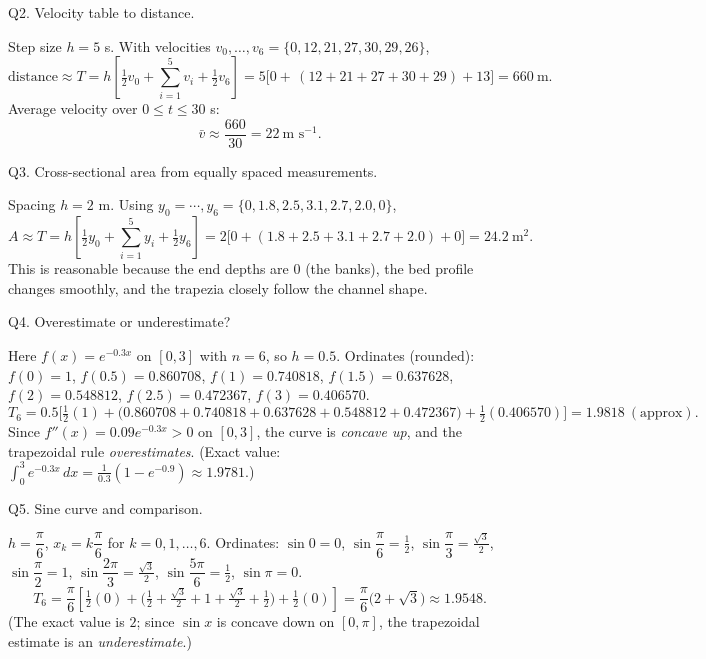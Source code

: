 \documentclass[11pt]{article}
\def\textbf#1{#1}%
\begin{document}
\begin{solution}
\textbf{Q2. Velocity table to distance.}

Step size \(h=5\) s.  With velocities \(v_0,\ldots,v_6=\{0,12,21,27,30,29,26\}\),
\[
\text{distance}\approx T
= h\!\left[\tfrac12 v_0+\sum_{i=1}^{5} v_i+\tfrac12 v_6\right]
= 5\Big[0+\,(12+21+27+30+29)+13\Big]
= \boxed{660\ \text{m}}.
\]
Average velocity over \(0\le t\le 30\) s:
\[
\bar v \approx \frac{660}{30}=\boxed{22\ \text{m s}^{-1}}.
\]
\end{solution}

\begin{solution}
\textbf{Q3. Cross-sectional area from equally spaced measurements.}

Spacing \(h=2\) m.  Using \(y_0=\cdots,y_6=\{0,1.8,2.5,3.1,2.7,2.0,0\}\),
\[
A \approx T
= h\!\left[\tfrac12 y_0+\sum_{i=1}^{5} y_i+\tfrac12 y_6\right]
= 2\big[0+(1.8+2.5+3.1+2.7+2.0)+0\big]
= \boxed{24.2\ \text{m}^2 }.
\]
This is reasonable because the end depths are \(0\) (the banks), the bed profile changes smoothly, and the trapezia closely follow the channel shape.
\end{solution}

\begin{solution}
\textbf{Q4. Overestimate or underestimate?}

Here \(f(x)=e^{-0.3x}\) on \([0,3]\) with \(n=6\), so \(h=0.5\).
Ordinates (rounded): \(f(0)=1\), \(f(0.5)=0.860708\), \(f(1)=0.740818\), \(f(1.5)=0.637628\),
\(f(2)=0.548812\), \(f(2.5)=0.472367\), \(f(3)=0.406570\).
\[
T_6
= 0.5\!\Big[\tfrac12(1)+\big(0.860708+0.740818+0.637628+0.548812+0.472367\big)+\tfrac12(0.406570)\Big]
= \boxed{1.9818}\ (\text{approx}).
\]
Since \(f''(x)=0.09e^{-0.3x}>0\) on \([0,3]\), the curve is \emph{concave up}, and the trapezoidal rule \emph{overestimates}.  
(Exact value: \(\int_0^3 e^{-0.3x}\,dx=\tfrac{1}{0.3}(1-e^{-0.9})\approx 1.9781\).)
\end{solution}

\begin{solution}
\textbf{Q5. Sine curve and comparison.}

\(h=\dfrac{\pi}{6}\), \(x_k=k\dfrac{\pi}{6}\) for \(k=0,1,\ldots,6\).
Ordinates: \(\sin 0=0\), \(\sin\dfrac{\pi}{6}=\tfrac12\), \(\sin\dfrac{\pi}{3}=\tfrac{\sqrt3}{2}\),
\(\sin\dfrac{\pi}{2}=1\), \(\sin\dfrac{2\pi}{3}=\tfrac{\sqrt3}{2}\), \(\sin\dfrac{5\pi}{6}=\tfrac12\), \(\sin\pi=0\).
\[
T_6
= \frac{\pi}{6}\!\left[\tfrac12(0)+\Big(\tfrac12+\tfrac{\sqrt3}{2}+1+\tfrac{\sqrt3}{2}+\tfrac12\Big)+\tfrac12(0)\right]
= \frac{\pi}{6}\Big(2+\sqrt3\Big)
\approx \boxed{1.9548}.
\]
(The exact value is \(2\); since \(\sin x\) is concave down on \([0,\pi]\), the trapezoidal estimate is an \emph{underestimate}.)
\end{solution}
\end{document}
